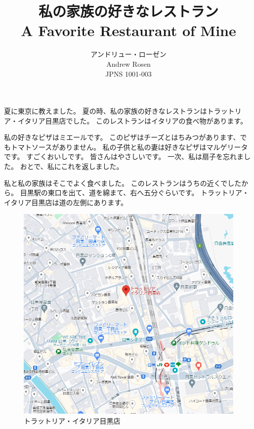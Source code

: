 \documentclass[12pt,a4paper]{article}
\title{私の家族の好きなレストラン\\\small{A Favorite Restaurant of Mine}}
\author{アンドリュー・ローゼン\\ \small{Andrew Rosen}\\\small{JPNS 1001-003}}
\date{}
\begin{document}
	\maketitle
	
	\doublespacing
	
	夏に東京に教えました。
	夏の時、私の家族の好きなレストランはトラットリア・イタリア目黒店でした。
	このレストランはイタリアの食べ物があります。
	
	私の好きなピザはミエールです。
	このピザはチーズとはちみつがあります、でもトマトソースがありません。
	私の子供と私の妻は好きなピザはマルゲリータです。
	すごくおいしです。
	皆さんはやさしいです。
	一次、私は扇子を忘れました。
	おとで、私にこれを返しました。
	
	私と私の家族はそこでよく食べました。
	このレストランはうちの近くでしたから。
	目黒駅の東口を出て、道を綿まて、右へ五分ぐらいです。
	トラットリア・イタリア目黒店は道の左側にあります。
	
	 
	\begin{figure}
		\centering
		\includegraphics[width=0.7\linewidth]{restaurant}
		\caption{トラットリア・イタリア目黒店}
		\label{fig:restaurant}
	\end{figure}
	
\end{document}
